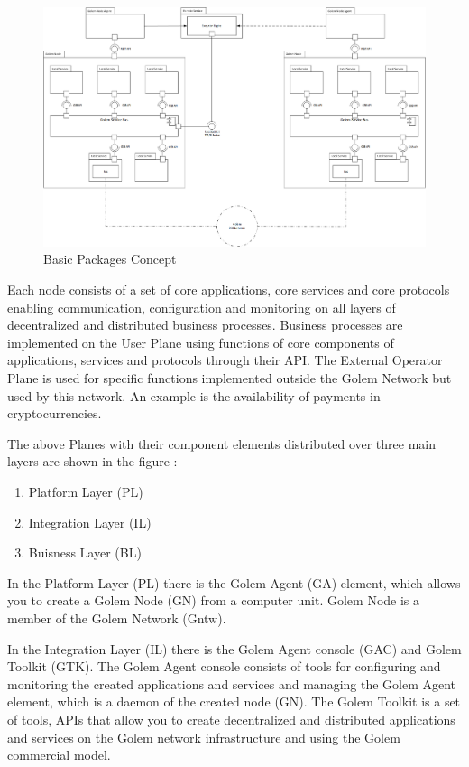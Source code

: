 \begin{figure}[H]
    \centering
    \includegraphics[width=18cm,angle=0]{./diag/Abstract/BasicPackages-Abstract.png}
	\caption{Basic Packages Concept}
    \label{fig:BPC}
\end{figure}

Each node consists of a set of core applications, core services
and core protocols enabling communication, configuration and monitoring 
on all layers of decentralized and distributed business processes.
Business processes are implemented on the User Plane using functions of 
core components of applications, services and protocols through their API.
The External Operator Plane is used for specific functions implemented
outside the Golem Network but used by this network. An example is the availability of
payments in cryptocurrencies.

The above Planes with their component elements distributed over three main layers 
are shown in the figure :

\begin{enumerate}
	\item Platform Layer (PL)
	\item Integration Layer (IL)
	\item Buisness Layer (BL)
\end{enumerate}

In the Platform Layer (PL) there is the Golem Agent (GA) element,
which allows you to create a Golem Node (GN) from a computer unit.
Golem Node is a member of the Golem Network (Gntw).

In the Integration Layer (IL) there is the Golem Agent console (GAC) and Golem Toolkit (GTK).
The Golem Agent console consists of tools for configuring and monitoring the created applications and services
and managing the Golem Agent element, which is a daemon of the created node (GN).
The Golem Toolkit is a set of tools, APIs that allow you to create decentralized and distributed applications and services
on the Golem network infrastructure and using the Golem commercial model.

